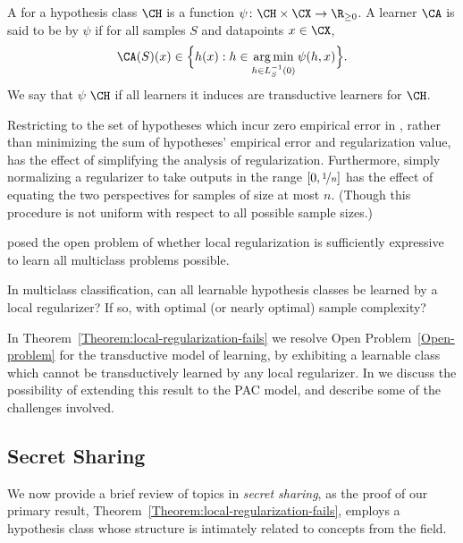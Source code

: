 \begin{definition}\label{Definition:local-regularizer}
A  for a hypothesis class $\CH$ is a function $\psi \colon \CH \times \CX \to \R_{\geq 0}$. A learner $\CA$ is said to be  by $\psi$ if for all samples $S$ and datapoints $x \in \CX$, 
\[ \CA(S)(x) \in \Big\{ h(x) : h \in \argmin_{h \in L_{S}^{-1}(0)} \psi(h, x) \Big\}. \]
We say that $\psi$  $\CH$ if all learners it induces are transductive learners for $\CH$. 
\end{definition}

\begin{remark}
Restricting to the set of hypotheses which incur zero empirical error in , rather than minimizing the sum of hypotheses' empirical error and regularization value, has the effect of simplifying the analysis of regularization. Furthermore, simply normalizing a regularizer to take outputs in the range $[0, \nicefrac{1}{n}]$ has the effect of equating the two perspectives for samples of size at most $n$. (Though this procedure is not uniform with respect to all possible sample sizes.) 
\end{remark}

\citet{asilis-open-problem} posed the open problem of whether local regularization is sufficiently expressive to learn all multiclass problems possible. 

\begin{open}\label{Open-problem}
In multiclass classification, can all learnable hypothesis classes be learned by a local regularizer? If so, with optimal (or nearly optimal) sample complexity?
\end{open}

In Theorem~\ref{Theorem:local-regularization-fails} we resolve Open Problem~\ref{Open-problem} for the transductive model of learning, by exhibiting a learnable class which cannot be transductively learned by any local regularizer. In  we discuss the possibility of extending this result to the PAC model, and describe some of the challenges involved. 

\subsection{Secret Sharing}

We now provide a brief review of topics in \emph{secret sharing}, as the proof of our primary result, Theorem~\ref{Theorem:local-regularization-fails}, employs a hypothesis class whose structure is intimately related to concepts from the field.

